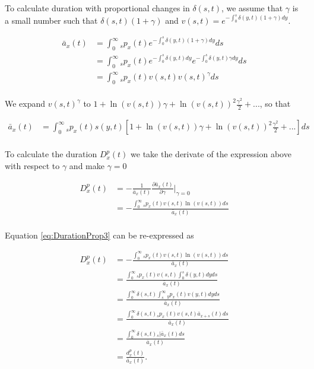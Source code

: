 \documentclass[12pt]{article}
\begin{document}
To calculate duration with proportional changes in $\delta(s,t)$, we assume that $\gamma$ is a small number such that $\delta(s,t)(1+\gamma)$ and  ${v}(s,t)=e^{-\int_0^{s}  \delta(y,t)(1+\gamma)dy}$.


\begin{equation}\label{eq:DurationProp1}
\begin{split}
\bar{a} _x(t) &= \int_0^\infty {}_sp_x(t) e^{-\int_0^{s}\delta(y,t)(1+\gamma)dy}ds \\
&= \int_0^\infty {}_sp_x(t) e^{-\int_0^{s}\delta(y,t)dy}e^{-\int_0^{s}\delta(y,t)\gamma dy}ds \\
&= \int_0^\infty {}_sp_x(t) v(s,t)v(s,t)^{\gamma}ds \\
\end{split}
\end{equation}


We expand $v(s,t)^{\gamma}$ to $1+\ln(v(s,t)) \gamma+{\ln(v(s,t))}^2 \frac{\gamma^2}{2}+...$, so that


\begin{equation}\label{eq:DurationProp2}
\begin{split}
\bar{a}_x(t) &= \int_0^\infty {}_sp_x(t) s(y,t)[1+\ln(v(s,t)) \gamma+{\ln(v(s,t))}^2 \frac{\gamma^2}{2}+...]ds\\
\end{split}
\end{equation}


To calculate the duration ${D}^{p}_{x}(t)$ we take the derivate of the expression above with respect to $\gamma$ and make $\gamma=0$

\begin{equation}\label{eq:DurationProp3}
\begin{split}
{D}^{p}_{x}(t)&=-\frac{1}{\bar{a}_x(t)}\frac{\partial \bar{a}_x(t)}{\partial \gamma} \bigg\rvert_{\gamma=0} \\
&= -\frac{\int_0^\infty {}_sp_x(t) v(s,t) \ln(v(s,t))ds}{\bar{a}_x(t)} \\
\end{split}
\end{equation}


Equation \ref{eq:DurationProp3} can be re-expressed as 


\begin{equation}\label{eq:DurationProp4}
\begin{split}
{D}^{p}_{x}(t) &= -\frac{\int_0^\infty {}_sp_x(t) v(s,t) \ln(v(s,t))ds}{\bar{a}_x(t)}\\
&= \frac{\int_0^\infty {}_sp_x(t) v(s,t) \int_0^{s} \delta(y,t)dy ds }{\bar{a}_x(t)}\\
&= \frac{\int_0^\infty \delta(s,t)  \int_{s}^{\infty} {}_{y}p_x(t) v(y,t)dy ds }{\bar{a}_x(t)}\\
&= \frac{\int_0^\infty \delta(s,t) {}_sp_x(t) v(s,t) \bar{a}_{x+s}(t)  ds }{\bar{a}_x(t)}\\
&= \frac{\int_0^\infty \delta(s,t) {}_s|\bar{a}_x(t) ds}{\bar{a}_x(t)} \\
&= \frac{{d}^{p}_{x}(t)}{\bar{a}_x(t)}.
\end{split}
\end{equation}
\end{document}
